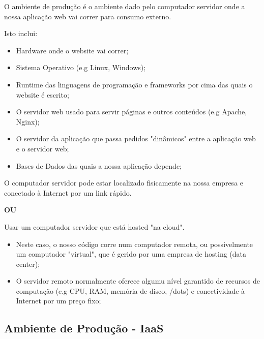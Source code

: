 \documentclass{article}
\begin{document}
\begin{flushleft}
O ambiente de produção é o ambiente dado pelo computador servidor
onde a nossa aplicação web vai correr para consumo externo.

Isto inclui:
\begin{itemize}
  \item Hardware onde o website vai correr;
  \item Sistema Operativo (e.g Linux, Windows);
  \item Runtime das linguagens de programação e frameworks por cima das quais o website é escrito;
  \item O servidor web usado para servir páginas e outros conteúdos (e.g Apache, Nginx);
  \item O servidor da aplicação que passa pedidos "dinâmicos" entre a aplicação web e o servidor web;
  \item Bases de Dados das quais a nossa aplicação depende;
\end{itemize}

\vspace{2mm}

O computador servidor pode estar localizado fisicamente na nossa empresa e
conectado à Internet por um link rápido.

\vspace{1mm}

\textbf{OU}

\vspace{1mm}

Usar um computador servidor que está hosted "na cloud".
\begin{itemize}
  \item Neste caso, o nosso código corre num computador remota, ou possivelmente
  um computador "virtual", que é gerido por uma empresa de hosting (data center);
  \item O servidor remoto normalmente oferece algumu nível garantido de recursos
  de computação (e.g CPU, RAM, memória de disco, /dots) e conectividade à Internet
  por um preço fixo;
\end{itemize}

\end{flushleft}

\subsection{Ambiente de Produção - IaaS}
\end{document}
